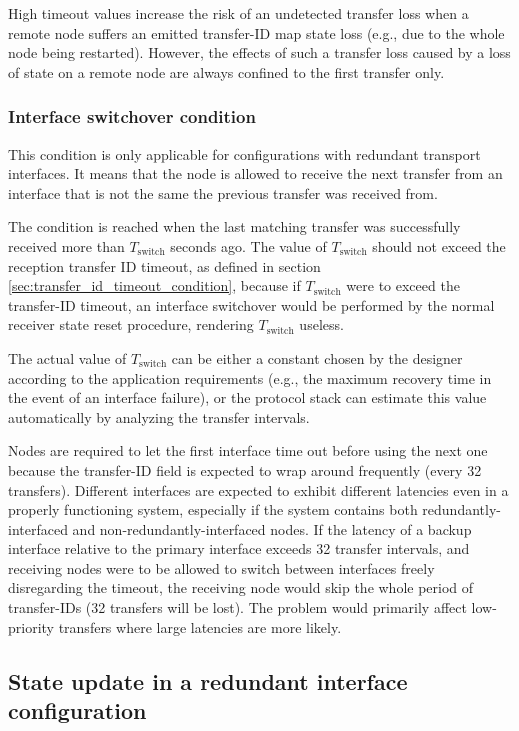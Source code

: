 High timeout values increase the risk of an undetected transfer loss when a remote node suffers an emitted transfer-ID
map state loss (e.g., due to the whole node being restarted).
However, the effects of such a transfer loss caused by a loss of state on a remote node
are always confined to the first transfer only.

\subsubsection{Interface switchover condition}\label{sec:transfer_interface_switchover_condition}

This condition is only applicable for configurations with redundant transport interfaces.
It means that the node is allowed to receive the next transfer from an interface that is not the same
the previous transfer was received from.

The condition is reached when the last matching transfer was successfully received more than
$T_\text{switch}$ seconds ago. The value of $T_\text{switch}$ should not exceed the reception transfer
ID timeout, as defined in section \ref{sec:transfer_id_timeout_condition},
because if $T_\text{switch}$ were to exceed the transfer-ID timeout, an interface switchover would be
performed by the normal receiver state reset procedure, rendering $T_\text{switch}$ useless.

The actual value of $T_\text{switch}$ can be either a constant chosen by the designer according
to the application requirements (e.g., the maximum recovery time in the event of an interface failure),
or the protocol stack can estimate this value automatically by analyzing the transfer intervals.

Nodes are required to let the first interface time out before using the next one because the
transfer-ID field is expected to wrap around frequently (every 32 transfers).
Different interfaces are expected to exhibit different latencies even in a properly functioning system,
especially if the system contains both redundantly-interfaced and non-redundantly-interfaced nodes.
If the latency of a backup interface relative to the primary interface exceeds 32 transfer intervals,
and receiving nodes were to be allowed to switch between interfaces freely disregarding the timeout,
the receiving node would skip the whole period of transfer-IDs (32 transfers will be lost).
The problem would primarily affect low-priority transfers where large latencies are more likely.

\subsection{State update in a redundant interface configuration}
\label{sec:transfer_reception_state_update_redundant}

